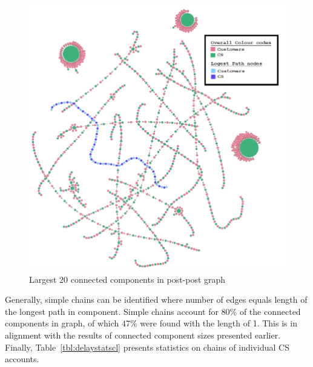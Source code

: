 \documentclass[sigconf]{acmart}
\begin{document}
\begin{figure}[htb]
\centering
\includegraphics[width=\columnwidth]{images/20ccpostpostgraph.png}
\caption{Largest 20 connected components in post-post graph}
\label{fig:20ccpostpostgraph}
\end{figure}

Generally, simple chains can be identified where number of edges
equals length of the longest path in component. Simple chains account for 80\%
of the connected components in graph, of which 47\% were found 
with the length of 1. This is in alignment with the
results of connected component sizes presented earlier. Finally,
Table~\ref{tbl:delaystatscl} presents statistics on chains of
individual CS accounts.

\end{document}
